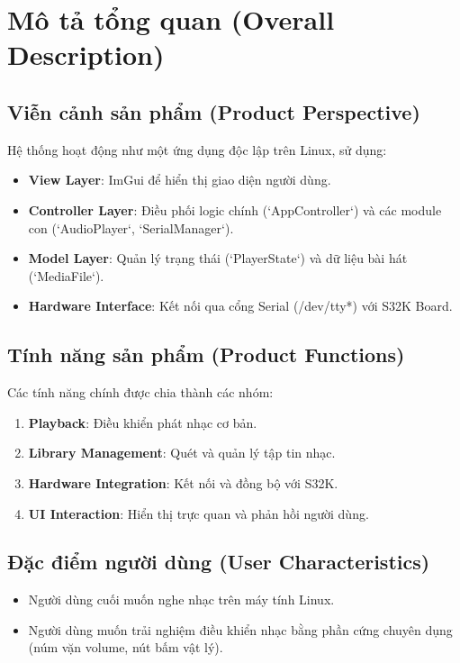 \documentclass{article}
\begin{document}
\newpage
\section{Mô tả tổng quan (Overall Description)}

\subsection{Viễn cảnh sản phẩm (Product Perspective)}
Hệ thống hoạt động như một ứng dụng độc lập trên Linux, sử dụng:
\begin{itemize}
    \item \textbf{View Layer}: ImGui để hiển thị giao diện người dùng.
    \item \textbf{Controller Layer}: Điều phối logic chính (`AppController`) và các module con (`AudioPlayer`, `SerialManager`).
    \item \textbf{Model Layer}: Quản lý trạng thái (`PlayerState`) và dữ liệu bài hát (`MediaFile`).
    \item \textbf{Hardware Interface}: Kết nối qua cổng Serial (/dev/tty*) với S32K Board.
\end{itemize}

\subsection{Tính năng sản phẩm (Product Functions)}
Các tính năng chính được chia thành các nhóm:
\begin{enumerate}
    \item \textbf{Playback}: Điều khiển phát nhạc cơ bản.
    \item \textbf{Library Management}: Quét và quản lý tập tin nhạc.
    \item \textbf{Hardware Integration}: Kết nối và đồng bộ với S32K.
    \item \textbf{UI Interaction}: Hiển thị trực quan và phản hồi người dùng.
\end{enumerate}

\subsection{Đặc điểm người dùng (User Characteristics)}
\begin{itemize}
    \item Người dùng cuối muốn nghe nhạc trên máy tính Linux.
    \item Người dùng muốn trải nghiệm điều khiển nhạc bằng phần cứng chuyên dụng (núm vặn volume, nút bấm vật lý).
\end{itemize}
\end{document}
